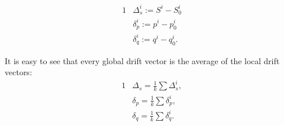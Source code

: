 \begin{alignat*}{1}
& \Delta_s^i:= S^i - S_0^i
\\ & \delta_p^i:= p^i - p_0^i
\\ & \delta_q^i:= q^i - q_0^i.
\end{alignat*}
\begin{remark} \label{average}
It is easy to see that every global drift vector is the average of the local drift vectors:
\begin{alignat*}{1}
& \Delta_s = \frac{1}{k} \sum \Delta_s^i, \\
& \delta_p = \frac{1}{k} \sum \delta_p^i, \\
& \delta_q = \frac{1}{k} \sum \delta_q^i.
\end{alignat*}

\end{remark}

